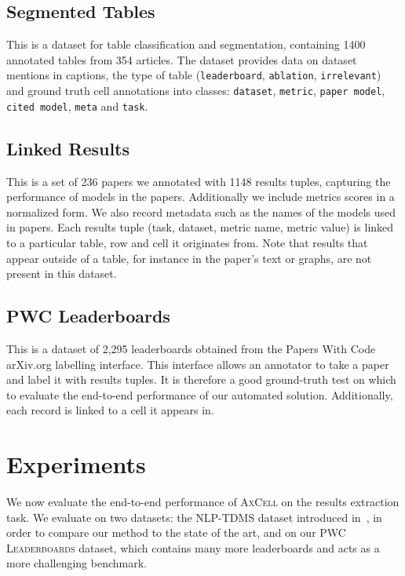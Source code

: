 \documentclass[11pt,a4paper]{article}
\newcommand{\model}{\textsc{AxCell}}
\newcommand{\leaderboards}{\textsc{PWC Leaderboards}}
\newcommand{\arxiv}{arXiv.org}
\begin{document}
\subsection{Segmented Tables}
\label{sec:dataset:structure}

This is a dataset for table classification and segmentation, containing 1400 annotated tables from 354 articles. The dataset provides data on dataset mentions in captions, the type of table (\texttt{leaderboard}, \texttt{ablation}, \texttt{irrelevant}) and ground truth cell annotations into classes: \texttt{dataset}, \texttt{metric}, \texttt{paper model}, \texttt{cited model}, \texttt{meta} and \texttt{task}.

\subsection{Linked Results}
\label{sec:dataset:results}

This is a set of 236 papers we annotated with 1148 results tuples, capturing the performance of models in the papers. Additionally we include metrics scores in a normalized form. We also record metadata such as the names of the models used in papers. Each results tuple (task, dataset, metric name, metric value) is linked to a particular table, row and cell it originates from. Note that results that appear outside of a table, for instance in the paper's text or graphs, are not present in this dataset.

\subsection{PWC Leaderboards}

This is a dataset of 2,295 leaderboards obtained from the Papers With Code \arxiv{} labelling interface. This interface allows an annotator to take a paper and label it with results tuples. It is therefore a good ground-truth test on which to evaluate the end-to-end performance of our automated solution.
Additionally, each record is linked to a cell it appears in.
 \section{Experiments}
We now evaluate the end-to-end performance of \model{} on the results extraction task. We evaluate on two datasets: the NLP-TDMS dataset introduced in~\citet{ibm-extraction}, in order to compare our method to the state of the art, and on our \leaderboards{} dataset, which contains many more leaderboards and acts as a more challenging benchmark. 
\end{document}
